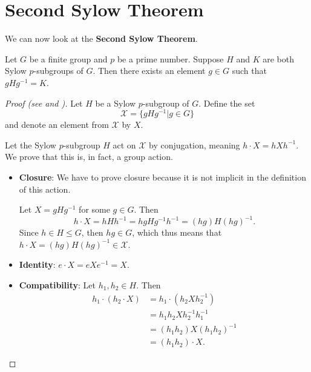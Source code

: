 \section{Second Sylow Theorem}
We can now look at the \textbf{Second Sylow Theorem}.
\begin{theorem}[Sylow II]\label{thrm-sylow-2}
    Let $G$ be a finite group and $p$ be a prime number. Suppose $H$ and $K$ are both Sylow $p$-subgroups of $G$. Then there exists an element $g \in G$ such that $gHg^{-1} = K$.
\end{theorem}
\begin{proof}[Proof (see {\cite[Theorem 11.10]{humphreys_1996}} and {\cite[pp.~3--5]{mann_2011}})]
    Let $H$ be a Sylow $p$-subgroup of $G$. Define the set
    \[
        \mathcal{X} = \{gHg^{-1} \vert g \in G\}
    \]
    and denote an element from $\mathcal{X}$ by $X$.

    Let the Sylow $p$-subgroup $H$ act on $\mathcal{X}$ by conjugation, meaning $h \cdot X = hXh^{-1}$. We prove that this is, in fact, a group action.
    
    \begin{itemize}
        \item \textbf{Closure}: We have to prove closure because it is not implicit in the definition of this action.

        Let $X = gHg^{-1}$ for some $g \in G$. Then
        \[
            h\cdot X = hHh^{-1} = hgHg^{-1}h^{-1} = (hg)H(hg)^{-1}.
        \]
        Since $h \in H \leq G$, then $hg \in G$, which thus means that $h \cdot X = (hg)H(hg)^{-1} \in \mathcal{X}$.
        \item \textbf{Identity}: $e \cdot X = eXe^{-1} = X$.
        \item \textbf{Compatibility}: Let $h_1, h_2 \in H$. Then
        \begin{align*}
            h_1 \cdot (h_2 \cdot X) &= h_1 \cdot (h_2Xh_2^{-1})\\
            &= h_1h_2Xh_2^{-1}h_1^{-1}\\
            &= (h_1h_2)X(h_1h_2)^{-1}\\
            &= (h_1h_2) \cdot X.
        \end{align*}
    \end{itemize}


\end{proof}
